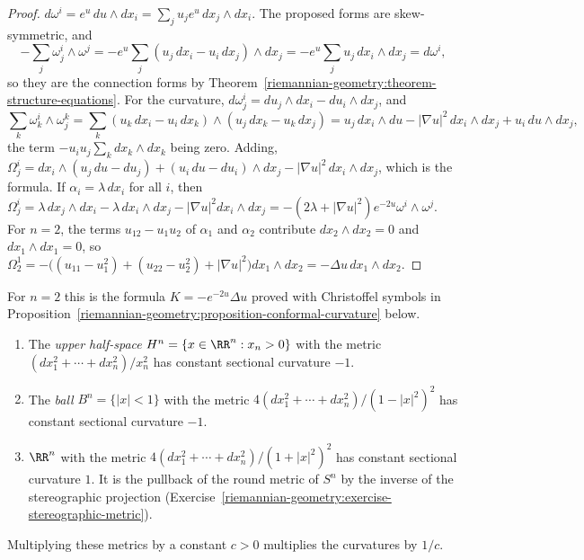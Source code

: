 \begin{proof}
$d\omega^i = e^u\,du \wedge dx_i = \sum_ju_je^u\,dx_j \wedge dx_i$. The proposed forms are skew-symmetric, and
\[
-\sum_j\omega^i_j \wedge \omega^j = -e^u\sum_j(u_j\,dx_i - u_i\,dx_j) \wedge dx_j = -e^u\sum_ju_j\,dx_i \wedge dx_j = d\omega^i,
\]
so they are the connection forms by Theorem~\ref{riemannian-geometry:theorem-structure-equations}. For the curvature, $d\omega^i_j = du_j \wedge dx_i - du_i \wedge dx_j$, and
\[
\sum_k\omega^i_k \wedge \omega^k_j = \sum_k(u_k\,dx_i - u_i\,dx_k) \wedge (u_j\,dx_k - u_k\,dx_j) = u_j\,dx_i \wedge du - |\nabla u|^2\,dx_i \wedge dx_j + u_i\,du \wedge dx_j,
\]
the term $-u_iu_j\sum_kdx_k \wedge dx_k$ being zero. Adding,
$\Omega^i_j = dx_i \wedge (u_j\,du - du_j) + (u_i\,du - du_i) \wedge dx_j - |\nabla u|^2\,dx_i \wedge dx_j$, which is the formula. If $\alpha_i = \lambda\,dx_i$ for all $i$, then
$\Omega^i_j = \lambda\,dx_j \wedge dx_i - \lambda\,dx_i \wedge dx_j - |\nabla u|^2dx_i \wedge dx_j = -(2\lambda + |\nabla u|^2)e^{-2u}\omega^i \wedge \omega^j$. For $n = 2$, the terms $u_{12} - u_1u_2$
of $\alpha_1$ and $\alpha_2$ contribute $dx_2 \wedge dx_2 = 0$ and $dx_1 \wedge dx_1 = 0$, so
$\Omega^1_2 = -\bigl((u_{11} - u_1^2) + (u_{22} - u_2^2) + |\nabla u|^2\bigr)dx_1 \wedge dx_2 = -\Delta u\,dx_1 \wedge dx_2$.
\end{proof}

For $n = 2$ this is the formula $K = -e^{-2u}\Delta u$ proved with Christoffel symbols in Proposition~\ref{riemannian-geometry:proposition-conformal-curvature} below.

\begin{corollary}\label{riemannian-geometry:corollary-hyperbolic-curvature}
\begin{enumerate}
\item The \emph{upper half-space} $H^n = \{x \in \RR^n : x_n > 0\}$ with the metric $(dx_1^2 + \cdots + dx_n^2)/x_n^2$ has constant sectional curvature $-1$.
\item The \emph{ball} $B^n = \{|x| < 1\}$ with the metric $4(dx_1^2 + \cdots + dx_n^2)/(1 - |x|^2)^2$ has constant sectional curvature $-1$.
\item $\RR^n$ with the metric $4(dx_1^2 + \cdots + dx_n^2)/(1 + |x|^2)^2$ has constant sectional curvature $1$. It is the pullback of the round metric of $S^n$ by the inverse of the stereographic
projection (Exercise~\ref{riemannian-geometry:exercise-stereographic-metric}).
\end{enumerate}
Multiplying these metrics by a constant $c > 0$ multiplies the curvatures by $1/c$.
\end{corollary}

